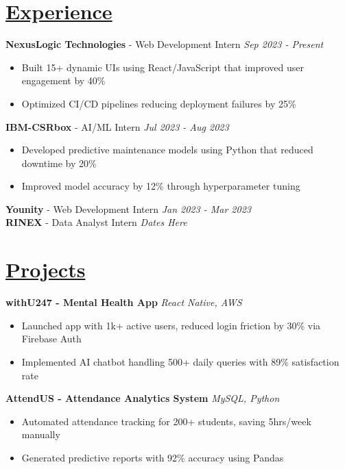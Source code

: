 \documentclass[a4paper,10pt]{article}
\begin{document}
\section*{\underline{Experience}}
\textbf{NexusLogic Technologies} - Web Development Intern \hfill \textit{Sep 2023 - Present}  %
\begin{itemize}[leftmargin=*]
    \item Built 15+ dynamic UIs using React/JavaScript that improved user engagement by 40\%
    \item Optimized CI/CD pipelines reducing deployment failures by 25\%
\end{itemize}

\textbf{IBM-CSRbox} - AI/ML Intern \hfill \textit{Jul 2023 - Aug 2023}  %
\begin{itemize}[leftmargin=*]
    \item Developed predictive maintenance models using Python that reduced downtime by 20\%
    \item Improved model accuracy by 12\% through hyperparameter tuning
\end{itemize}

\textbf{Younity} - Web Development Intern \hfill \textit{Jan 2023 - Mar 2023}\\
\textbf{RINEX} - Data Analyst Intern \hfill \textit{Dates Here}  %

\section*{\underline{Projects}}
\textbf{withU247 - Mental Health App} \hfill \textit{React Native, AWS}\\
\begin{itemize}[leftmargin=*]
    \item Launched app with 1k+ active users, reduced login friction by 30\% via Firebase Auth
    \item Implemented AI chatbot handling 500+ daily queries with 89\% satisfaction rate
\end{itemize}

\textbf{AttendUS - Attendance Analytics System} \hfill \textit{MySQL, Python}\\
\begin{itemize}[leftmargin=*]
    \item Automated attendance tracking for 200+ students, saving 5hrs/week manually
    \item Generated predictive reports with 92\% accuracy using Pandas
\end{itemize}
\end{document}

